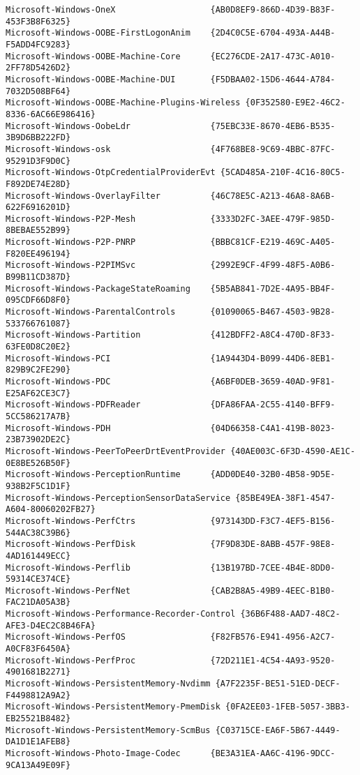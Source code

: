 \documentclass{report}
\begin{document}
\begin{lstlisting}[breaklines=true,basicstyle=\tiny]
Microsoft-Windows-OneX                   {AB0D8EF9-866D-4D39-B83F-453F3B8F6325}
Microsoft-Windows-OOBE-FirstLogonAnim    {2D4C0C5E-6704-493A-A44B-F5ADD4FC9283}
Microsoft-Windows-OOBE-Machine-Core      {EC276CDE-2A17-473C-A010-2FF78D5426D2}
Microsoft-Windows-OOBE-Machine-DUI       {F5DBAA02-15D6-4644-A784-7032D508BF64}
Microsoft-Windows-OOBE-Machine-Plugins-Wireless {0F352580-E9E2-46C2-8336-6AC66E986416}
Microsoft-Windows-OobeLdr                {75EBC33E-8670-4EB6-B535-3B9D6BB222FD}
Microsoft-Windows-osk                    {4F768BE8-9C69-4BBC-87FC-95291D3F9D0C}
Microsoft-Windows-OtpCredentialProviderEvt {5CAD485A-210F-4C16-80C5-F892DE74E28D}
Microsoft-Windows-OverlayFilter          {46C78E5C-A213-46A8-8A6B-622F6916201D}
Microsoft-Windows-P2P-Mesh               {3333D2FC-3AEE-479F-985D-8BEBAE552B99}
Microsoft-Windows-P2P-PNRP               {BBBC81CF-E219-469C-A405-F820EE496194}
Microsoft-Windows-P2PIMSvc               {2992E9CF-4F99-48F5-A0B6-B99B11CD387D}
Microsoft-Windows-PackageStateRoaming    {5B5AB841-7D2E-4A95-BB4F-095CDF66D8F0}
Microsoft-Windows-ParentalControls       {01090065-B467-4503-9B28-533766761087}
Microsoft-Windows-Partition              {412BDFF2-A8C4-470D-8F33-63FE0D8C20E2}
Microsoft-Windows-PCI                    {1A9443D4-B099-44D6-8EB1-829B9C2FE290}
Microsoft-Windows-PDC                    {A6BF0DEB-3659-40AD-9F81-E25AF62CE3C7}
Microsoft-Windows-PDFReader              {DFA86FAA-2C55-4140-BFF9-5CC586217A7B}
Microsoft-Windows-PDH                    {04D66358-C4A1-419B-8023-23B73902DE2C}
Microsoft-Windows-PeerToPeerDrtEventProvider {40AE003C-6F3D-4590-AE1C-0E8BE526B50F}
Microsoft-Windows-PerceptionRuntime      {ADD0DE40-32B0-4B58-9D5E-938B2F5C1D1F}
Microsoft-Windows-PerceptionSensorDataService {85BE49EA-38F1-4547-A604-80060202FB27}
Microsoft-Windows-PerfCtrs               {973143DD-F3C7-4EF5-B156-544AC38C39B6}
Microsoft-Windows-PerfDisk               {7F9D83DE-8ABB-457F-98E8-4AD161449ECC}
Microsoft-Windows-Perflib                {13B197BD-7CEE-4B4E-8DD0-59314CE374CE}
Microsoft-Windows-PerfNet                {CAB2B8A5-49B9-4EEC-B1B0-FAC21DA05A3B}
Microsoft-Windows-Performance-Recorder-Control {36B6F488-AAD7-48C2-AFE3-D4EC2C8B46FA}
Microsoft-Windows-PerfOS                 {F82FB576-E941-4956-A2C7-A0CF83F6450A}
Microsoft-Windows-PerfProc               {72D211E1-4C54-4A93-9520-4901681B2271}
Microsoft-Windows-PersistentMemory-Nvdimm {A7F2235F-BE51-51ED-DECF-F4498812A9A2}
Microsoft-Windows-PersistentMemory-PmemDisk {0FA2EE03-1FEB-5057-3BB3-EB25521B8482}
Microsoft-Windows-PersistentMemory-ScmBus {C03715CE-EA6F-5B67-4449-DA1D1E1AFEB8}
Microsoft-Windows-Photo-Image-Codec      {BE3A31EA-AA6C-4196-9DCC-9CA13A49E09F}

\end{lstlisting}
\end{document}
